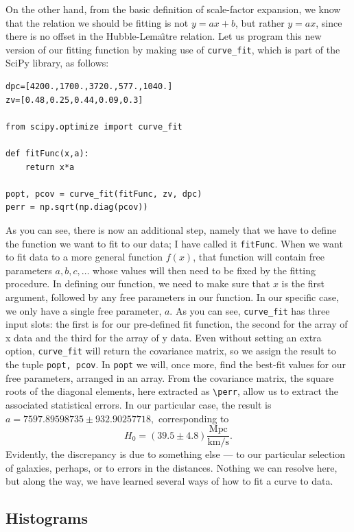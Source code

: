 \documentclass[twocolumn,apj]{openjournal}
\begin{document}
On the other hand, from the basic definition of scale-factor expansion, we know that the relation we should be fitting is not $y=ax+b$, but rather $y=ax$, since there is no offset in the Hubble-Lema\^{\i}tre relation. Let us program this new version of our fitting function by making use of \verb|curve_fit|, which is part of the SciPy library, as follows:
\begin{lstlisting}
dpc=[4200.,1700.,3720.,577.,1040.]
zv=[0.48,0.25,0.44,0.09,0.3]

from scipy.optimize import curve_fit

def fitFunc(x,a):
	return x*a
	
popt, pcov = curve_fit(fitFunc, zv, dpc)
perr = np.sqrt(np.diag(pcov))
\end{lstlisting}
As you can see, there is now an additional step, namely that we have to define the function we want to fit to our data; I have called it \verb|fitFunc|. When we want to fit data to a more general function $f(x)$, that function will contain free parameters $a,b,c,\dots$ whose values will then need to be fixed by the fitting procedure. In defining our function, we need to make sure that $x$ is the first argument, followed by any free parameters in our function. In our specific case, we only have a single free parameter, $a$. As you can see, \verb|curve_fit| has three input slots: the first is for our pre-defined fit function, the second for the array of x data and the third for the array of y data. Even without setting an extra option, \verb|curve_fit| will return the covariance matrix, so we assign the result to the tuple \verb|popt, pcov|. In \verb|popt| we will, once more, find the best-fit values for our free parameters, arranged in an array. From the covariance matrix, the square roots of the diagonal elements, here extracted as \verb|\perr|, allow us to extract the associated statistical errors. In our particular case, the result is $a = 7597.89598735\pm 932.90257718,$ corresponding to 
$$
H_0= (39.5\pm 4.8) \frac{\mbox{Mpc}}{\mbox{km/s}}.
$$
Evidently, the discrepancy is due to something else --- to our particular selection of galaxies, perhaps, or to errors in the distances. Nothing we can resolve here, but along the way, we have learned several ways of how to fit a curve to data.

\subsection{Histograms}
\label{HistogramsPython}
\end{document}
